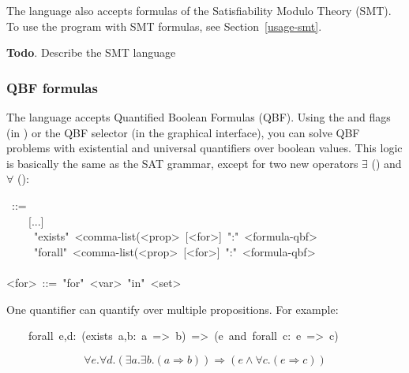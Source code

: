 \noindent The \touist language also accepts formulas of the Satisfiability Modulo Theory (SMT).
To use the  program with SMT formulas, see Section~\ref{usage-smt}.%

\noindent\textbf{Todo}.
Describe the SMT language%

\subsubsection{QBF formulas}\label{sec-qbf-formulas}%

\noindent The \touist language accepts Quantified Boolean Formulas (QBF). Using
the  and  flags (in ) or the QBF selector (in the
graphical interface), you can solve QBF problems with existential and
universal quantifiers over boolean values. This logic is basically the
same as the SAT grammar, except for two new operators $\exists$
() and $\forall$ ():%
\begin{mdpre}%
~::=\\
~~~~{}[...]\\
~~~~\textbar{}~"exists"~{\textless{}comma-list(\textless{}prop\textgreater{}}~{}[{\textless{}for\textgreater{}}]~":"~{\textless{}formula-qbf\textgreater{}}\\
~~~~\textbar{}~"forall"~{\textless{}comma-list(\textless{}prop\textgreater{}}~{}[{\textless{}for\textgreater{}}]~":"~{\textless{}formula-qbf\textgreater{}}\\
\\
{\textless{}for\textgreater{}}~::=~"for"~{\textless{}var\textgreater{}}~"in"~{\textless{}set\textgreater{}}%
\end{mdpre}\noindent One quantifier can quantify over multiple propositions. For example:
\begin{mdpre}%
\noindent~~~~{forall}~e,d:~({exists}~a,b:~a~=\textgreater{}~b)~=\textgreater{}~(e~and~{forall}~c:~e~=\textgreater{}~c)%
\end{mdpre}\noindent\noindent\[\forall e. \forall d. (\exists a. \exists b. (a \Rightarrow b)) \Rightarrow (e \wedge \forall c. (e \Rightarrow c))
\]%

